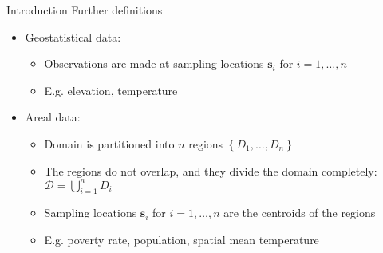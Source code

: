 \documentclass[12pt,t]{beamer}
\newcommand{\subt}[1]{{\footnotesize \color{subtitle} {#1}}}
\begin{document}
\begin{frame}{Introduction}
\subt{Further definitions}

\bigskip
\begin{itemize}
    \item Geostatistical data:
    \begin{itemize}
        \item Observations are made at sampling locations $\bm{s}_i$ for $i = 1, \dots, n$
        \item E.g. elevation, temperature
    \end{itemize}
    \item Areal data:
    \begin{itemize}
        \item Domain is partitioned into $n$ regions $\left\{ D_1, \dots, D_n \right\}$
        \item The regions do not overlap, and they divide the domain completely: $\mathcal{D} = \bigcup_{i=1}^n D_i$
        \item Sampling locations $\bm{s}_i$ for $i = 1, \dots, n$ are the centroids of the regions
        \item E.g. poverty rate, population, spatial mean temperature
    \end{itemize}
\end{itemize}


\end{frame}
\end{document}

